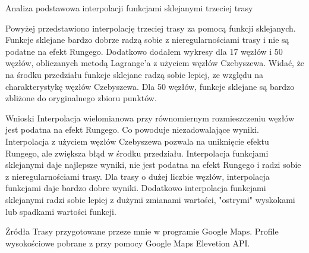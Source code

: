 \documentclass{article}
\begin{document}
\begin{section}{Analiza podstawowa interpolacji funkcjami sklejanymi trzeciej trasy}
  \begin{figure}[H]
    \centering
  \end{figure}
  \begin{figure}[H]
    \centering
  \end{figure}
  \begin{figure}[H]
    \centering
  \end{figure}
  \begin{figure}[H]
    \centering
  \end{figure}

  Powyżej przedstawiono interpolację trzeciej trasy za pomocą funkcji sklejanych. Funkcje sklejane bardzo dobrze
  radzą sobie z nieregularnościami trasy i nie są podatne na efekt Rungego. Dodatkowo dodałem wykresy dla 17 węzłów
  i 50 węzłów, obliczanych metodą Lagrange'a z użyciem węzłów Czebyszewa. Widać, że na środku przedziału funkcje
  sklejane radzą sobie lepiej, ze względu na charakterystykę węzłów Czebyszewa. Dla 50 węzłów, funkcje sklejane są
  bardzo zbliżone do oryginalnego zbioru punktów.
\end{section}

\begin{section}{Wnioski}
  Interpolacja wielomianowa przy równomiernym rozmieszczeniu węzłów jest podatna na efekt Rungego. Co powoduje 
  niezadowalające wyniki. Interpolacja z użyciem węzłów Czebyszewa pozwala na uniknięcie efektu Rungego, ale
  zwiększa błąd w środku przedziału. Interpolacja funkcjami sklejanymi daje najlepsze wyniki, nie jest podatna na
  efekt Rungego i radzi sobie z nieregularnościami trasy. Dla trasy o dużej liczbie węzłów, interpolacja funkcjami
  daje bardzo dobre wyniki. Dodatkowo interpolacja funkcjami sklejanymi radzi sobie lepiej z dużymi zmianami wartości,
  "ostrymi" wyskokami lub spadkami wartości funkcji.
\end{section}

\begin{section}{Źródła}
  Trasy przygotowane przeze mnie w programie Google Maps. Profile wysokościowe pobrane z przy pomocy Google Maps Elevetion API.
  
  \printbibliography
\end{section}
\end{document}
